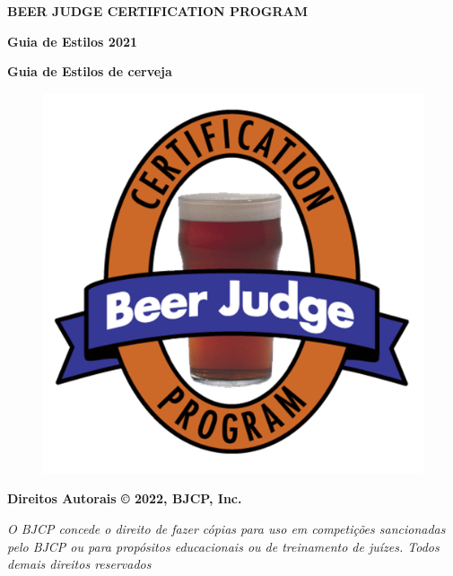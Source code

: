 \begin{titlepage}

    \centering
        {\fontsize{20}{32}\selectfont \textbf{BEER JUDGE CERTIFICATION PROGRAM}}\\

        \vspace{1cm}

        {\fontsize{30}{38}\selectfont \textbf{Guia de Estilos 2021 }}\\

        \vspace{1.5cm}

        {\fontsize{26}{32}\selectfont \textbf{Guia de Estilos de cerveja}}\\


        \begin{figure}[htp]
            \centering
            \includegraphics[]{assets/bjcp-logo}
            \label{fig:bjcp-logo}
        \end{figure}

        {\fontsize{12}{32}\selectfont \textbf{Direitos Autorais © 2022, BJCP, Inc.}}\\

        \vspace{0.5cm}

        {\fontsize{10}{32}\selectfont\textit{
            O BJCP concede o direito de fazer cópias para uso em competições sancionadas \break
            pelo BJCP ou para propósitos educacionais ou de treinamento de juízes.\break
            Todos demais direitos reservados
        }}\\


\end{titlepage}

